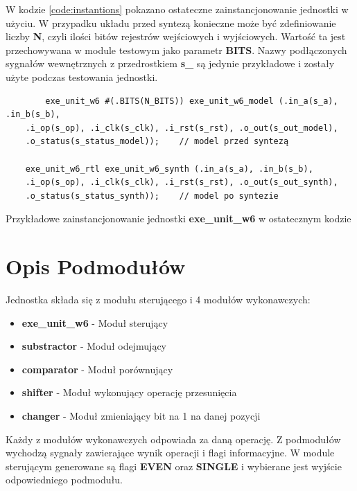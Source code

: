 \documentclass[12pt]{article}
\begin{document}
W kodzie \ref{code:instantions} pokazano ostateczne zainstancjonowanie jednostki w użyciu. W przypadku układu przed syntezą konieczne może być zdefiniowanie liczby \textbf{N}, czyli ilości bitów rejestrów wejściowych i wyjściowych. Wartość ta jest przechowywana w module testowym jako parametr \textbf{BITS}. Nazwy podłączonych sygnałów wewnętrznych z przedrostkiem \textbf{s\_} są jedynie przykładowe i zostały użyte podczas testowania jednostki.

\begin{program}
	\begin{verbatim}
		exe_unit_w6 #(.BITS(N_BITS)) exe_unit_w6_model (.in_a(s_a), .in_b(s_b),
	.i_op(s_op), .i_clk(s_clk), .i_rst(s_rst), .o_out(s_out_model),
	.o_status(s_status_model));    // model przed syntezą
	
	exe_unit_w6_rtl exe_unit_w6_synth (.in_a(s_a), .in_b(s_b),
	.i_op(s_op), .i_clk(s_clk), .i_rst(s_rst), .o_out(s_out_synth), 
	.o_status(s_status_synth));    // model po syntezie
	\end{verbatim}
	\caption{Przykładowe zainstancjonowanie jednostki \textbf{exe\_unit\_w6} w ostatecznym kodzie}
	\label{code:instantions}
\end{program}

	\vspace{-20pt}
	\section*{Opis Podmodułów}
	
	Jednostka składa się z modułu sterującego i 4 modułów wykonawczych:
	\begin{itemize}
		\setlength\itemsep{2pt}
		\item \textbf{exe\_unit\_w6} - Moduł sterujący
		\item \textbf{substractor} - Moduł odejmujący
		\item \textbf{comparator} - Moduł porównujący
		\item \textbf{shifter} - Moduł wykonujący operację przesunięcia
		\item \textbf{changer} - Moduł zmieniający bit na 1 na danej pozycji
	\end{itemize}
	Każdy z modułów wykonawczych odpowiada za daną operację. Z podmodułów wychodzą sygnały zawierające wynik operacji i flagi informacyjne. W module sterującym generowane są flagi \textbf{EVEN} oraz \textbf{SINGLE} i wybierane jest wyjście odpowiedniego podmodułu.
	
	
\end{document}
